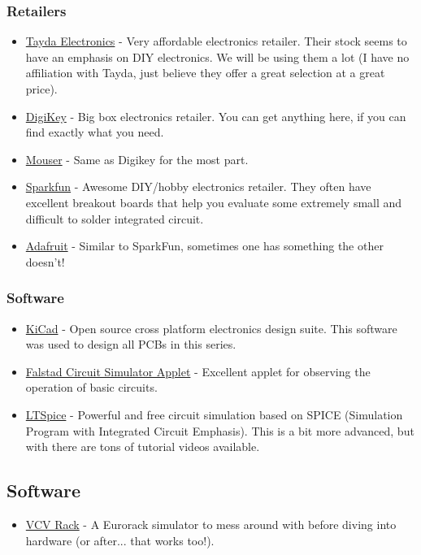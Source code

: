\documentclass{article}
\begin{document}
\subsubsection{Retailers}
\begin{itemize}
	\item \href{https://www.taydaelectronics.com}{Tayda Electronics} - Very affordable electronics retailer. Their stock seems to have an emphasis on DIY electronics. We will be using them a lot (I have no affiliation with Tayda, just believe they offer a great selection at a great price).
	\item \href{https://www.digikey.com}{DigiKey} - Big box electronics retailer. You can get anything here, if you can find exactly what you need.
	\item \href{https://www.mouser.com}{Mouser} - Same as Digikey for the most part.
	\item \href{https://www.sparkfun.com}{Sparkfun} - Awesome DIY/hobby electronics retailer. They often have excellent breakout boards that help you evaluate some extremely small and difficult to solder integrated circuit.
	\item \href{https://www.adafruit.com}{Adafruit} - Similar to SparkFun, sometimes one has something the other doesn't!
\end{itemize}
\subsubsection{Software}
\begin{itemize}
	\item \href{https://kicad-pcb.org}{KiCad} - Open source cross platform electronics design suite. This software was used to design all PCBs in this series.
	\item \href{http://www.falstad.com/circuit/}{Falstad Circuit Simulator Applet} - Excellent applet for observing the operation of basic circuits.
	\item \href{https://www.analog.com/en/design-center/design-tools-and-calculators/ltspice-simulator.html#}{LTSpice} - Powerful and free circuit simulation based on SPICE (Simulation Program with Integrated Circuit Emphasis). This is a bit more advanced, but with there are tons of tutorial videos available.
\end{itemize}

\subsection{Software}
\begin{itemize}
	\item \href{https://vcvrack.com}{VCV Rack} - A Eurorack simulator to mess around with before diving into hardware (or after... that works too!).
\end{itemize}
\end{document}
